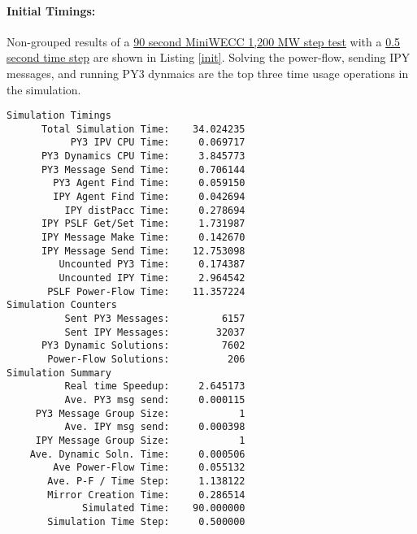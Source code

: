 \documentclass[12pt]{article}
\begin{document}
\begin{multicols}{2}
\raggedright
\paragraph{Initial Timings:} Non-grouped results of a \underline{90 second MiniWECC 1,200 MW step test} with a \underline{0.5 second time step} are shown in Listing \ref{init}. Solving the power-flow, sending IPY messages, and running PY3 dynmaics are the top three time usage operations in the simulation. 
\begin{lstlisting}[caption=Initial timings and counters., label=init]
Simulation Timings
      Total Simulation Time:    34.024235
           PY3 IPV CPU Time:     0.069717
      PY3 Dynamics CPU Time:     3.845773
      PY3 Message Send Time:     0.706144
        PY3 Agent Find Time:     0.059150
        IPY Agent Find Time:     0.042694
          IPY distPacc Time:     0.278694
      IPY PSLF Get/Set Time:     1.731987
      IPY Message Make Time:     0.142670
      IPY Message Send Time:    12.753098
         Uncounted PY3 Time:     0.174387
         Uncounted IPY Time:     2.964542
       PSLF Power-Flow Time:    11.357224
Simulation Counters
          Sent PY3 Messages:         6157
          Sent IPY Messages:        32037
      PY3 Dynamic Solutions:         7602
       Power-Flow Solutions:          206
Simulation Summary
          Real time Speedup:     2.645173
          Ave. PY3 msg send:     0.000115
     PY3 Message Group Size:            1
          Ave. IPY msg send:     0.000398
     IPY Message Group Size:            1
    Ave. Dynamic Soln. Time:     0.000506
        Ave Power-Flow Time:     0.055132
       Ave. P-F / Time Step:     1.138122
       Mirror Creation Time:     0.286514
             Simulated Time:    90.000000
       Simulation Time Step:     0.500000
\end{lstlisting}
\vfill\null
\columnbreak


\end{multicols}
\end{document}
